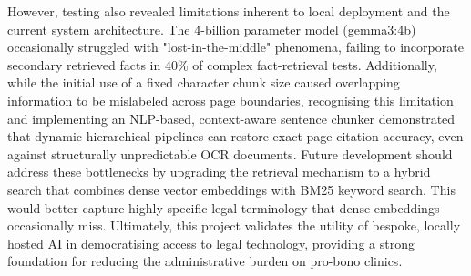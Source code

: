 \documentclass[11pt,a4paper]{article}
\begin{document}
However, testing also revealed limitations inherent to local deployment and the current system architecture. The 4-billion parameter model (gemma3:4b) occasionally struggled with "lost-in-the-middle" phenomena, failing to incorporate secondary retrieved facts in 40\% of complex fact-retrieval tests. Additionally, while the initial use of a fixed character chunk size caused overlapping information to be mislabeled across page boundaries, recognising this limitation and implementing an NLP-based, context-aware sentence chunker demonstrated that dynamic hierarchical pipelines can restore exact page-citation accuracy, even against structurally unpredictable OCR documents. Future development should address these bottlenecks by upgrading the retrieval mechanism to a hybrid search that combines dense vector embeddings with BM25 keyword search. This would better capture highly specific legal terminology that dense embeddings occasionally miss. Ultimately, this project validates the utility of bespoke, locally hosted AI in democratising access to legal technology, providing a strong foundation for reducing the administrative burden on pro-bono clinics.


\end{document}
